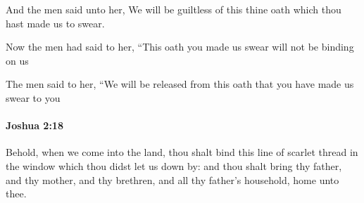 			\begin{versebox}
					\item[BHS] 
					\item[ASV] And the men said unto her, We will be guiltless of this thine oath which thou hast made us to swear.
					\item[NIV] Now the men had said to her, “This oath you made us swear will not be binding on us
					\item[NRSV] The men said to her, “We will be released from this oath that you have made us swear to you
			\end{versebox}

		\paragraph{Joshua 2:18} %
			\label{JOSHUA-2-18}

			Behold, when we come into the land, thou shalt bind this line of scarlet thread in the window which thou didst let us down by: and thou shalt bring thy father, and thy mother, and thy brethren, and all thy father’s household, home unto thee.

